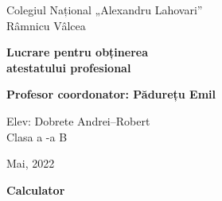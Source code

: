\begin{titlepage}
 \vspace*{3cm}

 \begin{center}
  \Large
  Colegiul Național „Alexandru Lahovari” \\ Râmnicu Vâlcea
 \end{center}

 \vspace*{3cm}

 \begin{center}
  \Huge
  \textbf{Lucrare pentru obținerea \\ atestatului profesional}
 \end{center}

 \vspace*{3cm}

 \begin{flushleft}
  \large
  \textbf{Profesor coordonator: Pădurețu Emil}
 \end{flushleft}

 \vspace*{3cm}

 \begin{flushright}
  \large
  Elev: Dobrete Andrei--Robert\\
  Clasa a -a B
 \end{flushright}

 \vspace*{3cm}

 \begin{center}
  Mai, 2022
 \end{center}
\end{titlepage}

\clearpage

\begin{titlepage}           %
 \vspace*{5cm}
 \begin{center}
  \Huge
  \textbf{Calculator}
 \end{center}
\end{titlepage}

\clearpage

